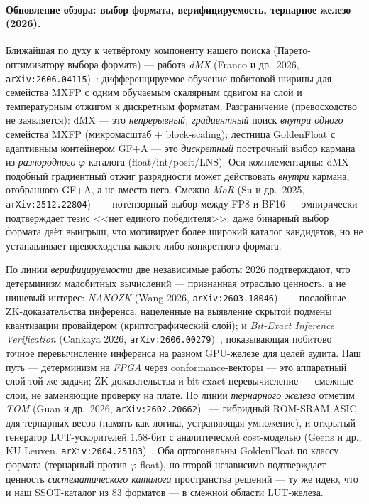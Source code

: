\documentclass[11pt,a4paper]{article}
\theoremstyle{plain}
\begin{document}
\paragraph{Обновление обзора: выбор формата, верифицируемость, тернарное железо (2026).}
Ближайшая по духу к четвёртому компоненту нашего поиска (Парето-оптимизатору
выбора формата) --- работа \emph{dMX} (Franco и др.\ 2026,
\texttt{arXiv:2606.04115})~\cite{dmx2026}: дифференцируемое обучение
побитовой ширины для семейства MXFP с одним обучаемым скалярным сдвигом на
слой и температурным отжигом к дискретным форматам. Разграничение
(превосходство не заявляется): dMX --- это \emph{непрерывный, градиентный}
поиск \emph{внутри одного} семейства MXFP (микромасштаб + block-scaling);
лестница GoldenFloat с адаптивным контейнером GF+A --- это \emph{дискретный}
построчный выбор кармана из \emph{разнородного} \(\varphi\)-каталога
(float/int/posit/LNS). Оси комплементарны: dMX-подобный градиентный отжиг
разрядности может действовать \emph{внутри} кармана, отобранного GF+A, а не
вместо него. Смежно \emph{MoR} (Su и др.\ 2025,
\texttt{arXiv:2512.22804})~\cite{mor2026} --- потензорный выбор между FP8 и
BF16 --- эмпирически подтверждает тезис <<нет единого победителя>>: даже
бинарный выбор формата даёт выигрыш, что мотивирует более широкий каталог
кандидатов, но не устанавливает превосходства какого-либо конкретного
формата.

По линии \emph{верифицируемости} две независимые работы 2026
подтверждают, что детерминизм малобитных вычислений --- признанная
отраслью ценность, а не нишевый интерес: \emph{NANOZK} (Wang 2026,
\texttt{arXiv:2603.18046})~\cite{nanozk2026} --- послойные
ZK-доказательства инференса, нацеленные на выявление скрытой подмены
квантизации провайдером (криптографический слой); и \emph{Bit-Exact
Inference Verification} (Cankaya 2026,
\texttt{arXiv:2606.00279})~\cite{bitexact2026}, показывающая побитово
точное перевычисление инференса на разном GPU-железе для целей аудита.
Наш путь --- детерминизм на \emph{FPGA} через conformance-векторы ---
это аппаратный слой той же задачи; ZK-доказательства и bit-exact
перевычисление --- смежные слои, не заменяющие проверку на плате.
По линии \emph{тернарного железа} отметим \emph{TOM} (Guan и др.\ 2026,
\texttt{arXiv:2602.20662})~\cite{tom2026} --- гибридный ROM-SRAM ASIC для
тернарных весов (память-как-логика, устраняющая умножение), и открытый
генератор LUT-ускорителей 1.58-бит с аналитической cost-моделью (Geens и
др., KU Leuven, \texttt{arXiv:2604.25183})~\cite{kuleuven2026}. Оба
ортогональны GoldenFloat по классу формата (тернарный против
\(\varphi\)-float), но второй независимо подтверждает ценность
\emph{систематического каталога} пространства решений --- ту же идею, что и
наш SSOT-каталог из 83 форматов --- в смежной области LUT-железа.
\end{document}
